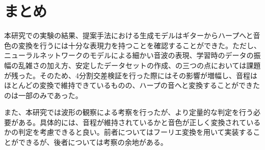 \chapter{まとめ}

本研究での実験の結果、提案手法における生成モデルはギターからハープへと音色の変換を行うには十分な表現力を持つことを確認することができた。ただし、ニューラルネットワークのモデルによる細かい音波の表現、学習時のデータの振幅の乱雑さの加え方、安定したデータセットの作成、の三つの点においては課題が残った。そのため、4分割交差検証を行った際にはその影響が増幅し、音程はほとんどの変換で維持できているものの、ハープの音へと変換することができたのは一部のみであった。

また、本研究では波形の観察による考察を行ったが、より定量的な判定を行う必要がある。具体的には、音程が維持されているかと音色が正しく変換されているかの判定を考慮できると良い。前者についてはフーリエ変換を用いて実装することができるが、後者については考察の余地がある。